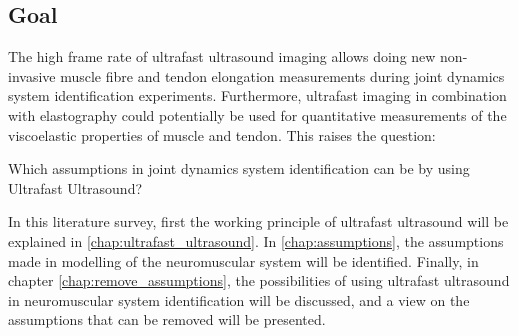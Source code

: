 \subsection*{Goal}
The high frame rate of ultrafast ultrasound imaging allows doing new non-invasive muscle fibre and tendon elongation measurements during joint dynamics system identification experiments. Furthermore, ultrafast imaging in combination with elastography could potentially be used for quantitative measurements of the viscoelastic properties of muscle and tendon. This raises the question: 
\begin{displayquote}
Which assumptions in joint dynamics system identification can be  by using Ultrafast Ultrasound?
\end{displayquote}

In this literature survey, first the working principle of ultrafast ultrasound will be explained in \autoref{chap:ultrafast_ultrasound}. In \autoref{chap:assumptions}, the assumptions made in modelling of the neuromuscular system will be identified. Finally, in chapter \ref{chap:remove_assumptions}, the possibilities of using ultrafast ultrasound in neuromuscular system identification will be discussed, and a view on the assumptions that can be removed will be presented. %




